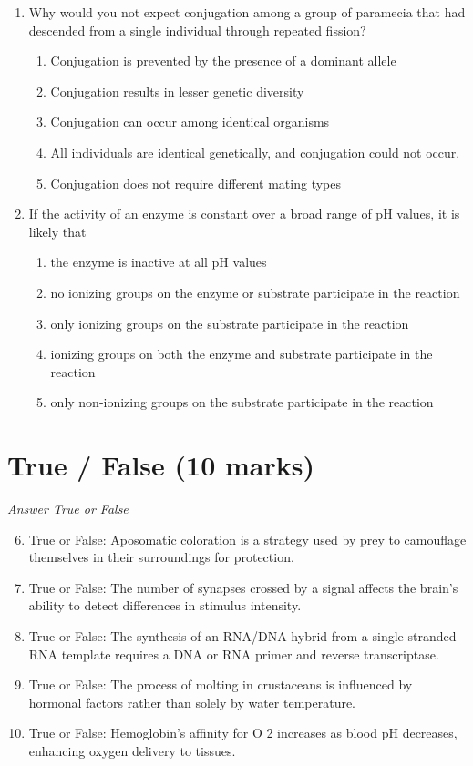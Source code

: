 \documentclass[12pt]{article}
\begin{document}
\begin{enumerate}[label=\arabic*.]
\item Why would you not expect conjugation among a group of paramecia that had descended from a single individual through repeated fission?
\begin{enumerate}[label=(\alph*)]
    \item Conjugation is prevented by the presence of a dominant allele
    \item Conjugation results in lesser genetic diversity
    \item Conjugation can occur among identical organisms
    \item All individuals are identical genetically, and conjugation could not occur.
    \item Conjugation does not require different mating types
\end{enumerate}
\item If the activity of an enzyme is constant over a broad range of pH values, it is likely that
\begin{enumerate}[label=(\alph*)]
    \item the enzyme is inactive at all pH values
    \item no ionizing groups on the enzyme or substrate participate in the reaction
    \item only ionizing groups on the substrate participate in the reaction
    \item ionizing groups on both the enzyme and substrate participate in the reaction
    \item only non-ionizing groups on the substrate participate in the reaction
\end{enumerate}
\end{enumerate}

\section*{True / False (10 marks)}
\textit{Answer True or False}
\begin{enumerate}[label=\arabic*.]
\setcounter{enumi}{5}
\item True or False: Aposomatic coloration is a strategy used by prey to camouflage themselves in their surroundings for protection.
\item True or False: The number of synapses crossed by a signal affects the brain's ability to detect differences in stimulus intensity.
\item True or False: The synthesis of an RNA/DNA hybrid from a single-stranded RNA template requires a DNA or RNA primer and reverse transcriptase.
\item True or False: The process of molting in crustaceans is influenced by hormonal factors rather than solely by water temperature.
\item True or False: Hemoglobin's affinity for O 2 increases as blood pH decreases, enhancing oxygen delivery to tissues.
\end{enumerate}
\end{document}
